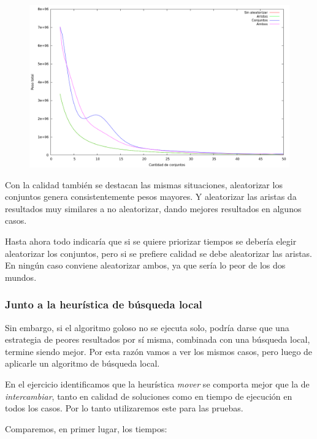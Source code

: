 \begin{figure}[H]
  \begin{center}
    \includegraphics[scale=0.35]{imagenes/grasp-goloso-k-peso.png}
  \end{center}
\end{figure}

Con la calidad también se destacan las mismas situaciones, aleatorizar los
conjuntos genera consistentemente pesos mayores. Y aleatorizar las aristas da
resultados muy similares a no aleatorizar, dando mejores resultados en algunos
casos.

Hasta ahora todo indicaría que si se quiere priorizar tiempos se debería elegir
aleatorizar los conjuntos, pero si se prefiere calidad se debe aleatorizar las
aristas. En ningún caso conviene aleatorizar ambos, ya que sería lo peor de los
dos mundos.

\newpage \subsubsection{Junto a la heurística de búsqueda local}

Sin embargo, si el algoritmo goloso no se ejecuta solo, podría darse que una
estrategia de peores resultados por sí misma, combinada con una búsqueda local,
termine siendo mejor. Por esta razón vamos a ver los mismos casos, pero luego
de aplicarle un algoritmo de búsqueda local.

En el ejercicio identificamos que la heurística \textit{mover} se comporta
mejor que la de \textit{intercambiar}, tanto en calidad de soluciones como en
tiempo de ejecución en todos los casos. Por lo tanto utilizaremos este para las
pruebas.

Comparemos, en primer lugar, los tiempos:

